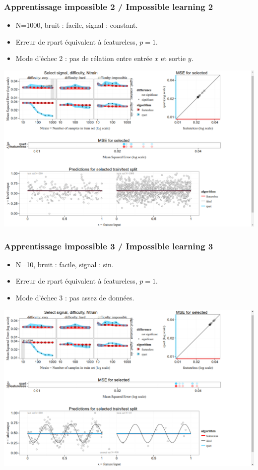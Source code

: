 \documentclass{beamer}
\begin{document}
\begin{frame}
  \frametitle{Apprentissage impossible 2 / Impossible learning 2}
  \begin{itemize}
  \item N=1000, bruit : facile, signal : constant.
  \item Erreur de rpart équivalent à featureless, $p=1$.
  \item Mode d'échec 2 : pas de rélation entre entrée $x$ et sortie $y$.
  \end{itemize}
  \includegraphics[width=\textwidth]{easy-1000-constant}
\end{frame}

\begin{frame}
  \frametitle{Apprentissage impossible 3 / Impossible learning 3}
  \begin{itemize}
  \item N=10, bruit : facile, signal : sin.
  \item Erreur de rpart équivalent à featureless, $p=1$.
  \item Mode d'échec 3 : pas assez de données.
  \end{itemize}
  \includegraphics[width=\textwidth]{easy-10}
\end{frame}
\end{document}
